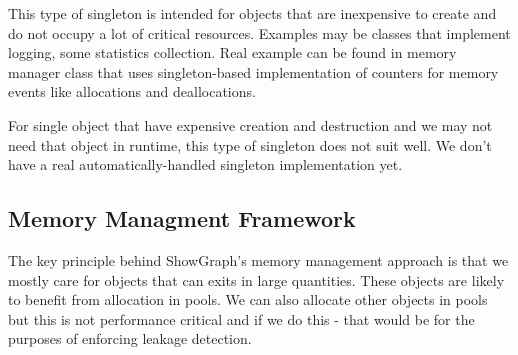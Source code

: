 \documentclass[11pt,a4paper]{article}
\begin{document}
This type of singleton is intended for objects that are inexpensive to create and do not occupy a lot of critical resources. Examples may be classes that implement logging, some statistics collection. Real example can be found in memory manager class that uses singleton-based implementation of counters for memory events like allocations and deallocations.

For single object that have expensive creation and destruction and we may not need that object in runtime, this type of singleton does not suit well. We don't have a real automatically-handled singleton implementation yet.

\subsection{Memory Managment Framework}
The key principle behind ShowGraph's memory management approach is that we mostly care for objects that can exits in large quantities. These objects are likely to benefit from allocation in pools. We can also allocate other objects in pools but this is not performance critical and if we do this - that would be for the purposes of enforcing leakage detection.
\end{document}
